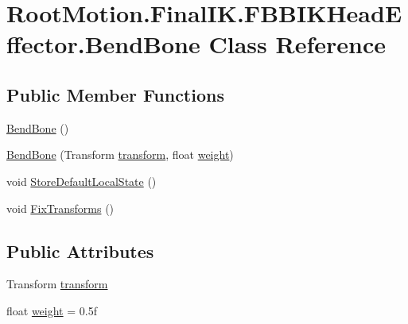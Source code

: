 \hypertarget{class_root_motion_1_1_final_i_k_1_1_f_b_b_i_k_head_effector_1_1_bend_bone}{}\section{Root\+Motion.\+Final\+I\+K.\+F\+B\+B\+I\+K\+Head\+Effector.\+Bend\+Bone Class Reference}
\label{class_root_motion_1_1_final_i_k_1_1_f_b_b_i_k_head_effector_1_1_bend_bone}
\subsection*{Public Member Functions}
\begin{DoxyCompactItemize}
\item 
\mbox{\hyperlink{class_root_motion_1_1_final_i_k_1_1_f_b_b_i_k_head_effector_1_1_bend_bone_ab6b85b4cfb664af461af620f82c35efa}{Bend\+Bone}} ()
\item 
\mbox{\hyperlink{class_root_motion_1_1_final_i_k_1_1_f_b_b_i_k_head_effector_1_1_bend_bone_a43b0bee099c48a8303721f2daac8962f}{Bend\+Bone}} (Transform \mbox{\hyperlink{class_root_motion_1_1_final_i_k_1_1_f_b_b_i_k_head_effector_1_1_bend_bone_a38ba95a86cc87ed9d13d0ff7f033afbc}{transform}}, float \mbox{\hyperlink{class_root_motion_1_1_final_i_k_1_1_f_b_b_i_k_head_effector_1_1_bend_bone_a80d46af0c9098a0d892fe8c3ed6cf373}{weight}})
\item 
void \mbox{\hyperlink{class_root_motion_1_1_final_i_k_1_1_f_b_b_i_k_head_effector_1_1_bend_bone_a72bf87f5adc45607ddce1937dd9d9642}{Store\+Default\+Local\+State}} ()
\item 
void \mbox{\hyperlink{class_root_motion_1_1_final_i_k_1_1_f_b_b_i_k_head_effector_1_1_bend_bone_ad36fe7fb4551cb96e04b456a5b174fb5}{Fix\+Transforms}} ()
\end{DoxyCompactItemize}
\subsection*{Public Attributes}
\begin{DoxyCompactItemize}
\item 
Transform \mbox{\hyperlink{class_root_motion_1_1_final_i_k_1_1_f_b_b_i_k_head_effector_1_1_bend_bone_a38ba95a86cc87ed9d13d0ff7f033afbc}{transform}}
\item 
float \mbox{\hyperlink{class_root_motion_1_1_final_i_k_1_1_f_b_b_i_k_head_effector_1_1_bend_bone_a80d46af0c9098a0d892fe8c3ed6cf373}{weight}} = 0.\+5f
\end{DoxyCompactItemize}


